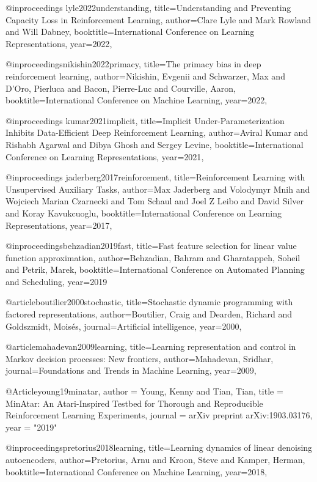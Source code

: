 @inproceedings{
lyle2022understanding,
title={Understanding and Preventing Capacity Loss in Reinforcement Learning},
author={Clare Lyle and Mark Rowland and Will Dabney},
booktitle={International Conference on Learning Representations},
year={2022},
}

@inproceedings{nikishin2022primacy,
  title={The primacy bias in deep reinforcement learning},
  author={Nikishin, Evgenii and Schwarzer, Max and D’Oro, Pierluca and Bacon, Pierre-Luc and Courville, Aaron},
  booktitle={International Conference on Machine Learning},
  year={2022},
}

@inproceedings{
kumar2021implicit,
title={Implicit Under-Parameterization Inhibits Data-Efficient Deep Reinforcement Learning},
author={Aviral Kumar and Rishabh Agarwal and Dibya Ghosh and Sergey Levine},
booktitle={International Conference on Learning Representations},
year={2021},
}

@inproceedings{
jaderberg2017reinforcement,
title={Reinforcement Learning with Unsupervised Auxiliary Tasks},
author={Max Jaderberg and Volodymyr Mnih and Wojciech Marian Czarnecki and Tom Schaul and Joel Z Leibo and David Silver and Koray Kavukcuoglu},
booktitle={International Conference on Learning Representations},
year={2017},
}

@inproceedings{behzadian2019fast,
  title={Fast feature selection for linear value function approximation},
  author={Behzadian, Bahram and Gharatappeh, Soheil and Petrik, Marek},
  booktitle={International Conference on Automated Planning and Scheduling},
  year={2019}
}

@article{boutilier2000stochastic,
  title={Stochastic dynamic programming with factored representations},
  author={Boutilier, Craig and Dearden, Richard and Goldszmidt, Mois{\'e}s},
  journal={Artificial intelligence},
  year={2000},
}

@article{mahadevan2009learning,
  title={Learning representation and control in Markov decision processes: New frontiers},
  author={Mahadevan, Sridhar},
  journal={Foundations and Trends{\textregistered} in Machine Learning},
  year={2009},
}

@Article{young19minatar,
author = {{Young}, Kenny and {Tian}, Tian},
title = {MinAtar: An Atari-Inspired Testbed for Thorough and Reproducible Reinforcement Learning Experiments},
journal = {arXiv preprint arXiv:1903.03176},
year = "2019"
}

@inproceedings{pretorius2018learning,
  title={Learning dynamics of linear denoising autoencoders},
  author={Pretorius, Arnu and Kroon, Steve and Kamper, Herman},
  booktitle={International Conference on Machine Learning},
  year={2018},
}

